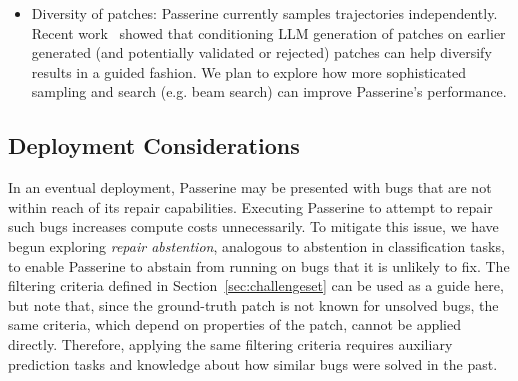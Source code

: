 \begin{itemize}
    \item Diversity of patches: Passerine currently
    samples trajectories independently. Recent work~\cite{chatrepair} showed
    that conditioning LLM generation of patches on earlier generated (and potentially
    validated or rejected) patches can help diversify results in a guided fashion.
    We plan to explore how more sophisticated sampling and search (e.g. beam search)
    can improve Passerine's performance.

\end{itemize}







    
    
    



\subsection{Deployment Considerations}

In an eventual deployment, Passerine may be presented
with bugs that are not within reach of its repair capabilities.
Executing Passerine to attempt to repair such bugs increases compute
costs unnecessarily.
To mitigate this issue, we have begun exploring
\emph{repair abstention}, analogous to abstention in 
classification tasks, to enable Passerine to 
abstain from running on bugs that it is unlikely to fix. 
The filtering criteria defined in Section~\ref{sec:challengeset} can be
used as a guide here, but note that, since the ground-truth patch is not
known for unsolved bugs, the same criteria, which depend on properties of the patch, cannot be applied directly. 
Therefore, applying the same filtering criteria requires auxiliary prediction tasks and knowledge about
how similar bugs were solved in the past.



